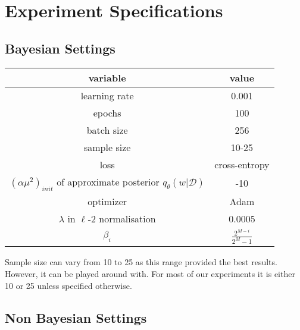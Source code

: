 \chapter{Experiment Specifications} 

\section*{Bayesian Settings}

\begin{table}[h!]
    \centering
    \renewcommand{\arraystretch}{2}
    \begin{tabular}[c]{c | c} 
     \hline
     variable & value \\ [0.5ex] 
     \hline
     learning rate &  0.001\\ 
     
     epochs & 100 \\
     
     batch size & 256 \\
     
     sample size & 10-25 \\
     
     loss & cross-entropy \\
     
     $(\alpha \mu^2)_{init}$ of approximate posterior $q_{\theta}(w|\mathcal{D})$ & -10 \\
     
     optimizer & Adam \cite{kingma2014adam} \\
     
     $\lambda$ in $\ell$-2 normalisation & 0.0005 \\
    
     $\beta_i$ & $\frac{2^{M-i}}{2^M-1}$ \cite{blundell2015weight} \\ [1ex] 
     \hline
    \end{tabular} 
    \renewcommand{\arraystretch}{2}
\end{table}

Sample size can vary from 10 to 25 as this range provided the best results. However, it can be played around with. For most of our experiments it is either 10 or 25 unless specified otherwise. 

\section*{Non Bayesian Settings}


